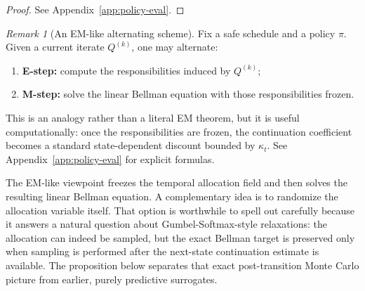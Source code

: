 \documentclass{article}
\theoremstyle{remark}
\newtheorem{remark}[remark]{Remark}
\begin{document}
\begin{proof}
See Appendix~\ref{app:policy-eval}.
\end{proof}

\begin{remark}[An EM-like alternating scheme]
\label{rem:em-analogy}
Fix a safe schedule and a policy $\pi$.
Given a current iterate $Q^{(k)}$, one may alternate:
\begin{enumerate}[leftmargin=1.5em,itemsep=2pt]
    \item \textbf{E-step:} compute the responsibilities induced by $Q^{(k)}$;
    \item \textbf{M-step:} solve the linear Bellman equation with those responsibilities frozen.
\end{enumerate}
This is an analogy rather than a literal EM theorem, but it is useful computationally: once the responsibilities are frozen, the continuation coefficient becomes a standard state-dependent discount bounded by $\kappa_t$.
See Appendix~\ref{app:policy-eval} for explicit formulas.
\end{remark}


The EM-like viewpoint freezes the temporal allocation field and then solves the resulting linear Bellman equation.
A complementary idea is to randomize the allocation variable itself.
That option is worthwhile to spell out carefully because it answers a natural question about Gumbel-Softmax-style relaxations: the allocation can indeed be sampled, but the exact Bellman target is preserved only when sampling is performed after the next-state continuation estimate is available.
The proposition below separates that exact post-transition Monte Carlo picture from earlier, purely predictive surrogates.
\end{document}
